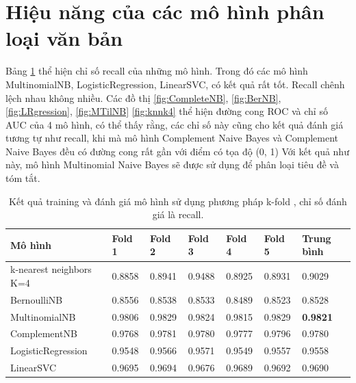 \documentclass[../DoAn.tex]{subfiles}
\begin{document}
\section{Hiệu năng của các mô hình phân loại văn bản}
Bảng \ref{tab:recall} thể hiện chỉ số recall của những mô hình. Trong đó các mô hình  MultinomialNB, LogisticRegression, LinearSVC, có kết quả rất tốt. Recall chênh lệch nhau không nhiều. Các đồ thị \ref{fig:CompleteNB}, \ref{fig:BerNB}, \ref{fig:LRgression}, \ref{fig:MTilNB} \ref{fig:knnk4} thể hiện đường cong ROC và chỉ số AUC của 4 mô hình, có thể thấy rằng, các chỉ số này cũng cho kết quả đánh giá tương tự như recall, khi mà mô hình Complement Naive Bayes và Complement Naive Bayes đều có đường cong rất gần với điểm có tọa độ (0, 1)
Với kết quả như này, mô hình Multinomial Naive Bayes sẽ được sử dụng để phân loại tiêu đề và tóm tắt.
\begin{table}[]
\centering
\caption{Kết quả training và đánh giá mô hình sử dụng phương pháp k-fold , chỉ số đánh giá là recall.}
\label{tab:recall}
\begin{tabular}{@{}lllllll@{}}
\toprule
Mô hình                 & Fold 1 & Fold 2 & Fold 3 & Fold 4 & Fold 5 & Trung bình \\ \midrule
k-nearest neighbors K=4 & 0.8858 & 0.8941 & 0.9488 & 0.8925 & 0.8931 & 0.9029     \\
BernoulliNB             & 0.8556 & 0.8538 & 0.8533 & 0.8489 & 0.8523 & 0.8528     \\
MultinomialNB           & 0.9806 & 0.9829 & 0.9824 & 0.9815 & 0.9829 & \textbf{0.9821}     \\
ComplementNB            & 0.9768 & 0.9781 & 0.9780 & 0.9777 & 0.9796 & 0.9780     \\
LogisticRegression      & 0.9548 & 0.9566 & 0.9571 & 0.9549 & 0.9557 & 0.9558     \\
LinearSVC               & 0.9695 & 0.9694 & 0.9676 & 0.9689 & 0.9692 & 0.9690     \\ \bottomrule
\end{tabular}
\end{table}
\end{document}
